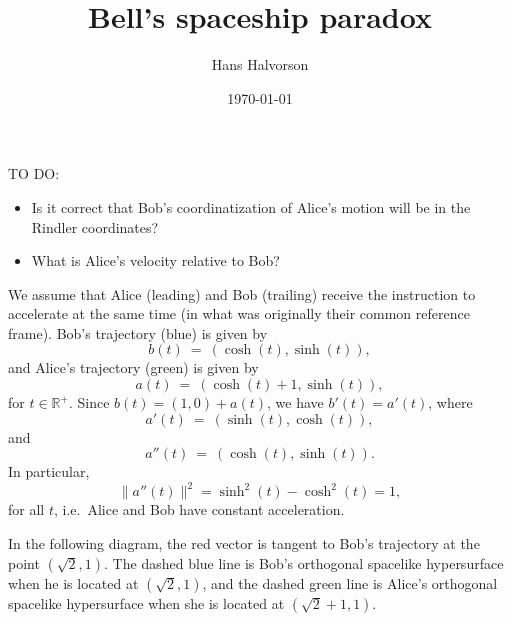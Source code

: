 \documentclass[tikz,border=10pt,fleqn]{article}
\title{Bell's spaceship paradox}
\author{Hans Halvorson}
\date{\today}
\theoremstyle{definition}
\begin{document}
\maketitle

TO DO:
\begin{itemize}
\item Is it correct that Bob's coordinatization of Alice's motion will
  be in the Rindler coordinates?
\item What is Alice's velocity relative to Bob?   
\end{itemize}

We assume that Alice (leading) and Bob (trailing) receive the
instruction to accelerate at the same time (in what was originally
their common reference frame). Bob's trajectory (blue) is given by
\[ b(t) \: = \: (\cosh (t),\sinh (t)) , \] and Alice's trajectory
(green) is given by
\[ a(t) \: = \: (\cosh (t)+1,\sinh (t)) ,\] for
$t\in\mathbb{R}^+$. Since $b(t)=(1,0)+a(t)$, we have $b'(t)=a'(t)$,
where \[ a'(t) \: = \: (\sinh (t),\cosh(t)) ,\] and
\[ a''(t) \: = \: (\cosh (t),\sinh (t)) .\] In particular,
\[ \| a''(t) \|^2 = \sinh ^2 (t)-\cosh ^2(t) = 1 ,\] for all $t$,
i.e.\ Alice and Bob have constant acceleration.

In the following diagram, the red vector is tangent to Bob's
trajectory at the point $(\sqrt{2},1)$. The dashed blue line is Bob's
orthogonal spacelike hypersurface when he is located at
$(\sqrt{2},1)$, and the dashed green line is Alice's orthogonal
spacelike hypersurface when she is located at $(\sqrt{2}+1,1)$.
\end{document}
